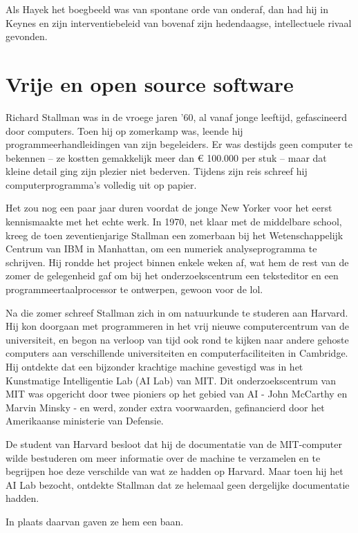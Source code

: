 \documentclass[
  a5paper,
  smalldemyvopaper,11pt,twoside,onecolumn,openright,extrafontsizes]{memoir}
\begin{document}
Als Hayek het boegbeeld was van spontane orde van onderaf, dan had hij
in Keynes en zijn interventiebeleid van bovenaf zijn hedendaagse,
intellectuele rivaal gevonden.

\chapter{Vrije en open source
software}\label{vrije-en-open-source-software}

Richard Stallman was in de vroege jaren '60, al vanaf jonge leeftijd,
gefascineerd door computers. Toen hij op zomerkamp was, leende hij
programmeerhandleidingen van zijn begeleiders. Er was destijds geen
computer te bekennen -- ze kostten gemakkelijk meer dan € 100.000 per
stuk -- maar dat kleine detail ging zijn plezier niet bederven. Tijdens
zijn reis schreef hij computerprogramma's volledig uit op papier.

Het zou nog een paar jaar duren voordat de jonge New Yorker voor het
eerst kennismaakte met het echte werk. In 1970, net klaar met de
middelbare school, kreeg de toen zeventienjarige Stallman een zomerbaan
bij het Wetenschappelijk Centrum van IBM in Manhattan, om een numeriek
analyseprogramma te schrijven. Hij rondde het project binnen enkele
weken af, wat hem de rest van de zomer de gelegenheid gaf om bij het
onderzoekscentrum een teksteditor en een programmeertaalprocessor te
ontwerpen, gewoon voor de lol.

Na die zomer schreef Stallman zich in om natuurkunde te studeren aan
Harvard. Hij kon doorgaan met programmeren in het vrij nieuwe
computercentrum van de universiteit, en begon na verloop van tijd ook
rond te kijken naar andere gehoste computers aan verschillende
universiteiten en computerfaciliteiten in Cambridge. Hij ontdekte dat
een bijzonder krachtige machine gevestigd was in het Kunstmatige
Intelligentie Lab (AI Lab) van MIT. Dit onderzoekscentrum van MIT was
opgericht door twee pioniers op het gebied van AI - John McCarthy en
Marvin Minsky - en werd, zonder extra voorwaarden, gefinancierd door het
Amerikaanse ministerie van Defensie.

De student van Harvard besloot dat hij de documentatie van de
MIT-computer wilde bestuderen om meer informatie over de machine te
verzamelen en te begrijpen hoe deze verschilde van wat ze hadden op
Harvard. Maar toen hij het AI Lab bezocht, ontdekte Stallman dat ze
helemaal geen dergelijke documentatie hadden.

In plaats daarvan gaven ze hem een baan.
\end{document}
